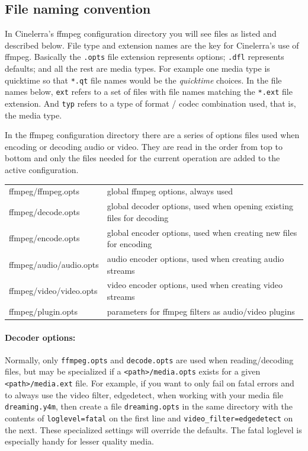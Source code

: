 \subsection{File naming convention}%
\label{sub:file_naming_convention}

In Cinelerra's ffmpeg configuration directory you will see files as listed and described below.  File type and extension names are the key for Cinelerra's use of ffmpeg.  Basically the \texttt{.opts} file extension represents options; \texttt{.dfl} represents defaults; and all the rest are media types.  For example one media type is quicktime so that \texttt{*.qt} file names would be the \textit{quicktime} choices.  In the file names below, \texttt{ext} refers to a set of files with file names matching the \texttt{*.ext} file extension.  And \texttt{typ} refers to a type of format / codec combination used, that is, the media type.

In the ffmpeg configuration directory there are a series of options files used when encoding or decoding audio or video.  They are read in the order from top to bottom and only the files needed for the current operation are added to the active configuration.

\begin{center}
    \small
    \begin{tabular}{l l}
        \toprule
        ffmpeg/ffmpeg.opts & global ffmpeg options, always used \\
        ffmpeg/decode.opts & global decoder options, used when opening existing files for decoding \\
        ffmpeg/encode.opts & global encoder options, used when creating new files for encoding \\
        ffmpeg/audio/audio.opts & audio encoder options, used when creating audio streams \\
        ffmpeg/video/video.opts & video encoder options, used when creating video streams \\
        ffmpeg/plugin.opts & parameters for ffmpeg filters as audio/video plugins \\
        \bottomrule
    \end{tabular}
\end{center}

\paragraph{Decoder options:} Normally, only \texttt{ffmpeg.opts} and \texttt{decode.opts} are used when reading/decoding files, but may be specialized if a \texttt{<path>/media.opts} exists for a given \texttt{<path>/media.ext} file.  For example, if you want to only fail on fatal errors and to always use the video filter, edgedetect, when working with your media file \texttt{dreaming.y4m}, then create a file \texttt{dreaming.opts} in the same directory with the contents of \texttt{loglevel=fatal} on the first line and \texttt{video\_filter=edgedetect} on the next.  These specialized settings will override the defaults.  The fatal loglevel is especially handy for lesser quality media.

